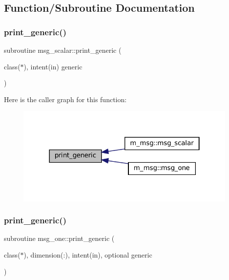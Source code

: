 \subsection{Function/\+Subroutine Documentation}
\mbox{\label{M__msg_8f90_aaa8ee15f943d8e1543ae35ab732c3cd2}} 
\subsubsection{\texorpdfstring{print\+\_\+generic()}{print\_generic()}\hspace{0.1cm}{\footnotesize\ttfamily [1/2]}}
{\footnotesize\ttfamily subroutine msg\+\_\+scalar\+::print\+\_\+generic (\begin{DoxyParamCaption}\item[{class($\ast$), intent(in)}]{generic }\end{DoxyParamCaption})\hspace{0.3cm}{\ttfamily [private]}}

Here is the caller graph for this function\+:\nopagebreak
\begin{figure}[H]
\begin{center}
\leavevmode
\includegraphics[width=310pt]{M__msg_8f90_aaa8ee15f943d8e1543ae35ab732c3cd2_icgraph}
\end{center}
\end{figure}
\mbox{\label{M__msg_8f90_a9d5e1620d474ac03a74eeb9b0f7d6ae1}} 
\subsubsection{\texorpdfstring{print\+\_\+generic()}{print\_generic()}\hspace{0.1cm}{\footnotesize\ttfamily [2/2]}}
{\footnotesize\ttfamily subroutine msg\+\_\+one\+::print\+\_\+generic (\begin{DoxyParamCaption}\item[{class($\ast$), dimension(\+:), intent(in), optional}]{generic }\end{DoxyParamCaption})\hspace{0.3cm}{\ttfamily [private]}}

